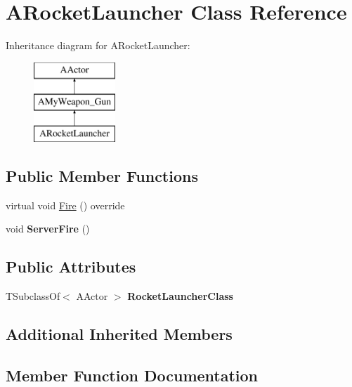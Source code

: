 \hypertarget{class_a_rocket_launcher}{}\section{A\+Rocket\+Launcher Class Reference}
\label{class_a_rocket_launcher}
Inheritance diagram for A\+Rocket\+Launcher\+:\begin{figure}[H]
\begin{center}
\leavevmode
\includegraphics[height=3.000000cm]{class_a_rocket_launcher}
\end{center}
\end{figure}
\subsection*{Public Member Functions}
\begin{DoxyCompactItemize}
\item 
virtual void \mbox{\hyperlink{class_a_rocket_launcher_a32f4db5a70f3a9e6b8cf0d8c0e84f78b}{Fire}} () override
\item 
\mbox{\label{class_a_rocket_launcher_af09c3d3fd27a768ddafde48045b3e4e5}} 
void {\bfseries Server\+Fire} ()
\end{DoxyCompactItemize}
\subsection*{Public Attributes}
\begin{DoxyCompactItemize}
\item 
\mbox{\label{class_a_rocket_launcher_a4974bb444bf93eb2c6d7d6e04e6ea4a0}} 
T\+Subclass\+Of$<$ A\+Actor $>$ {\bfseries Rocket\+Launcher\+Class}
\end{DoxyCompactItemize}
\subsection*{Additional Inherited Members}


\subsection{Member Function Documentation}
\mbox{\label{class_a_rocket_launcher_a32f4db5a70f3a9e6b8cf0d8c0e84f78b}} 
